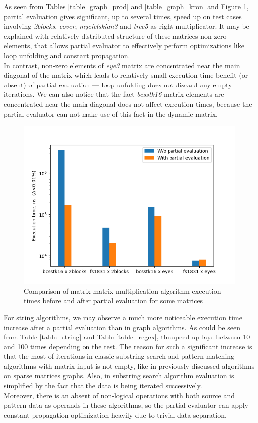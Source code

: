\documentclass[conference]{IEEEtran}
\begin{document}
As seen from Tables \ref{table_graph_prod} and \ref{table_graph_kron} and Figure \ref{fig:multpe}, partial evaluation gives significant, up to several times, speed up on test cases involving \textit{2blocks}, \textit{cover}, \textit{mycielskian3} and \textit{trec5} as right multiplicator. It may be explained with relatively distributed structure of these matrices non-zero elements, that allows partial evaluator to effectively perform optimizations like loop unfolding and constant propagation.\\
In contrast, non-zero elements of \textit{eye3} matrix are concentrated near the main diagonal of the matrix which leads to relatively small execution time benefit (or absent) of partial evaluation --- loop unfolding does not discard any empty iterations.
We can also notice that the fact \textit{bcsstk16} matrix elements are concentrated near the main diagonal does not affect execution times, because the partial evaluator can not make use of this fact in the dynamic matrix.

\begin{figure}
	\centering
	\includegraphics[scale=0.6]{matrix-mult}
	\caption{Comparison of matrix-matrix multiplication algorithm execution times before and after partial evaluation for some matrices}
	\label{fig:multpe}
\end{figure}

For string algorithms, we may observe a much more noticeable execution time increase after a partial evaluation than in graph algorithms. As could be seen from Table \ref{table_string} and Table \ref{table_regex}, the speed up lays between 10 and 100 times depending on the test. The reason for such a significant increase is that the most of iterations in classic substring search and pattern matching algorithms \cite{cormen2009introduction} with matrix input is not empty, like in previously discussed algorithms on sparse matrices graphs. Also, in substring search algorithm evaluation is simplified by the fact that the data is being iterated successively.\\
Moreover, there is an absent of non-logical operations with both source and pattern data as operands in these algorithms, so the partial evaluator can apply constant propagation optimization heavily due to trivial data separation.
\end{document}
